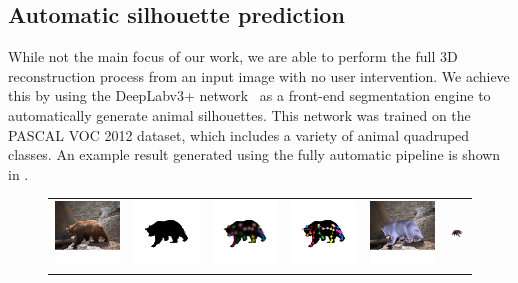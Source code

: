 \subsection{Automatic silhouette prediction}
While not the main focus of our work, we are able to perform the full 3D reconstruction process from an input image with no user intervention. We achieve this by using the DeepLabv3+ network~\cite{deeplabv3plus} as a front-end segmentation engine to automatically generate animal silhouettes. This network was trained on the PASCAL VOC 2012 dataset, which includes a variety of animal quadruped classes. An example result generated using the fully automatic pipeline is shown in .

\clearpage

\begin{figure}[h!]
\def\bb{\rule{2in}{0pt}\rule{0pt}{1in}}
\def\lp#1[#2]#3{\parbox{0.16\linewidth}{\labelledpic{#1}{\texttt{[image: \#3]}}}}
\begin{tabular}{cccccc}
\includegraphics[trim={0 2cm 0 1.25cm},clip,width=0.16\linewidth]{res_bear_new/rgb.jpg} & 
\includegraphics[trim={0 2cm 0 1.25cm},clip,width=0.16\linewidth]{res_bear_new/target.jpg} & 
\includegraphics[trim={0 2cm 0 1.25cm},clip,width=0.16\linewidth]{res_bear_new/heatmap.jpg} & 
\includegraphics[trim={0 2cm 0 1.25cm},clip,width=0.16\linewidth]{res_bear_new/cleaned_skeleton_sil.jpg} &
\includegraphics[trim={0 2cm 0 1.25cm},clip,width=0.16\linewidth]{res_bear_new/3d_fit_overlay_rgb.jpg} & 
\includegraphics[trim={0 2cm 0 1.25cm},clip,width=0.16\linewidth]{res_bear_new/3d_fit_reversed.jpg} \\


\end{tabular}
\end{figure}
